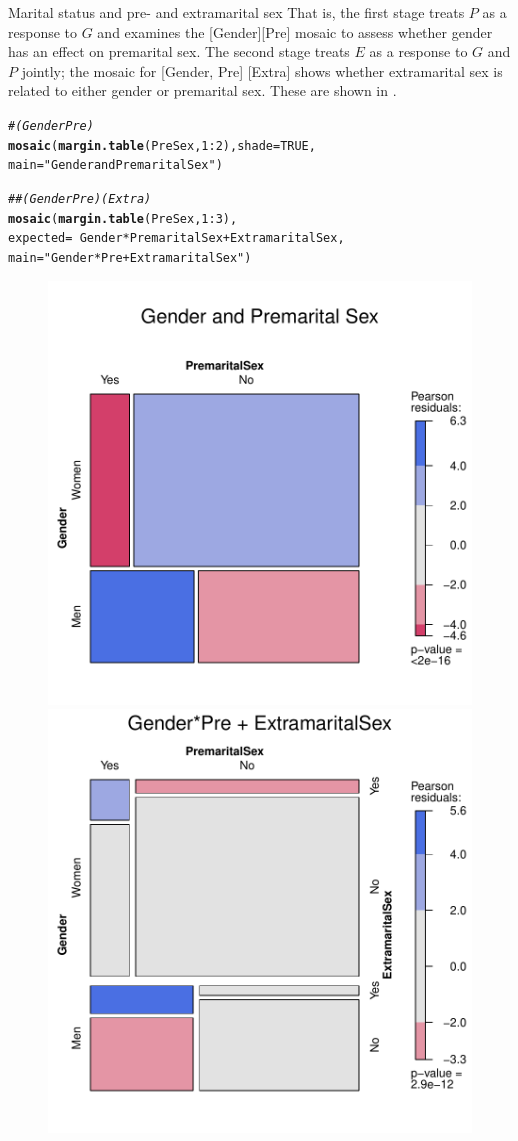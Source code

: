 \documentclass[11pt]{book}\usepackage[]{graphicx}\usepackage[]{color}
\makeatletter
\newcommand{\hlnum}[1]{\textcolor[rgb]{0.686,0.059,0.569}{#1}}%
\newcommand{\hlstr}[1]{\textcolor[rgb]{0.192,0.494,0.8}{#1}}%
\newcommand{\hlcom}[1]{\textcolor[rgb]{0.678,0.584,0.686}{\textit{#1}}}%
\newcommand{\hlopt}[1]{\textcolor[rgb]{0,0,0}{#1}}%
\newcommand{\hlstd}[1]{\textcolor[rgb]{0.345,0.345,0.345}{#1}}%
\newcommand{\hlkwc}[1]{\textcolor[rgb]{0.333,0.667,0.333}{#1}}%
\newcommand{\hlkwd}[1]{\textcolor[rgb]{0.737,0.353,0.396}{\textbf{#1}}}%
\newenvironment{kframe}{%
 \def\at@end@of@kframe{}%
 \ifinner\ifhmode%
  \def\at@end@of@kframe{\end{minipage}}%
  \begin{minipage}{\columnwidth}%
 \fi\fi%
 \def\FrameCommand##1{\hskip\@totalleftmargin \hskip-\fboxsep
 \colorbox{shadecolor}{##1}\hskip-\fboxsep
     \hskip-\linewidth \hskip-\@totalleftmargin \hskip\columnwidth}%
 \MakeFramed {\advance\hsize-\width
   \@totalleftmargin\z@ \linewidth\hsize
   \@setminipage}}%
 {\par\unskip\endMakeFramed%
 \at@end@of@kframe}
\newenvironment{knitrout}{}{} %
\renewenvironment{knitrout}{\small\renewcommand{\baselinestretch}{.85}}{} %
\makeatother
\begin{document}
\begin{Example}[marital1]{Marital status and pre- and extramarital sex}
That is, the first stage  treats $P$ as a
response to $G$ and examines the [Gender][Pre] mosaic to assess
whether gender has an effect on premarital sex.  The second stage
treats $E$ as a response to $G$ and $P$ jointly;  the
mosaic for [Gender, Pre] [Extra] shows whether extramarital sex
is related to either gender or premarital sex.  These are shown
in .

\begin{knitrout}
\color{fgcolor}\begin{kframe}
\begin{alltt}
\hlcom{# (Gender Pre)}
\hlkwd{mosaic}\hlstd{(}\hlkwd{margin.table}\hlstd{(PreSex,} \hlnum{1}\hlopt{:}\hlnum{2}\hlstd{),} \hlkwc{shade}\hlstd{=}\hlnum{TRUE}\hlstd{,}
                \hlkwc{main} \hlstd{=} \hlstr{"Gender and Premarital Sex"}\hlstd{)}

\hlcom{## (Gender Pre)(Extra)}
\hlkwd{mosaic}\hlstd{(}\hlkwd{margin.table}\hlstd{(PreSex,} \hlnum{1}\hlopt{:}\hlnum{3}\hlstd{),}
       \hlkwc{expected} \hlstd{=} \hlopt{~}\hlstd{Gender} \hlopt{*} \hlstd{PremaritalSex} \hlopt{+} \hlstd{ExtramaritalSex ,}
       \hlkwc{main} \hlstd{=} \hlstr{"Gender*Pre + ExtramaritalSex"}\hlstd{)}
\end{alltt}
\end{kframe}\begin{figure}[htbp]


\centerline{\includegraphics[width=.49\textwidth]{ch05/fig/presex21} 
\includegraphics[width=.49\textwidth]{ch05/fig/presex22} }


\end{figure}
\end{knitrout}
\end{Example}
\end{document}
